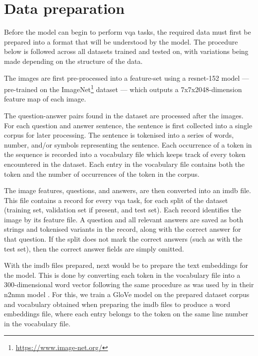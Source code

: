 \section{Data preparation}
\label{sec:data_preparation}

Before the model can begin to perform \gls{vqa} tasks, the required data must first be prepared into a format that will be understood by the model. The procedure below is followed across all datasets trained and tested on, with variations being made depending on the structure of the data.

The images are first pre-processed into a feature-set using a \acrshort{resnet}-152 model \cite{he_deep_2015} — pre-trained on the ImageNet\footnote{\url{https://www.image-net.org/}} dataset \cite{deng_imagenet_2009} — which outputs a 7x7x2048-dimension feature map of each image.

The question-answer pairs found in the dataset are processed after the images. For each question and answer sentence, the sentence is first collected into a single \gls{corpus} for later processing. The sentence is tokenised into a series of words, number, and/or symbols representing the sentence. Each occurrence of a token in the sequence is recorded into a vocabulary file which keeps track of every token encountered in the dataset. Each entry in the vocabulary file contains both the token and the number of occurrences of the token in the \gls{corpus}.

The image features, questions, and answers, are then converted into an \gls{imdb} file. This file contains a record for every \acrshort{vqa} task, for each split of the dataset (training set, validation set if present, and test set). Each record identifies the image by its feature file. A question and all relevant answers are saved as both strings and tokenised variants in the record, along with the correct answer for that question. If the split does not mark the correct answers (such as with the test set), then the correct answer fields are simply omitted.

With the \gls{imdb} files prepared, next would be to prepare the text embeddings for the model.
This is done by converting each token in the vocabulary file into a 300-dimensional word vector following the same procedure as was used by \citeauthor{hu_learning_2017} in their \gls{n2nmn} model \cite{hu_learning_2017}.
For this, we train a GloVe model \cite{pennington_glove_2014} on the prepared dataset \gls{corpus} and vocabulary obtained when preparing the \gls{imdb} files to produce a word embeddings file, where each entry belongs to the token on the same line number in the vocabulary file.


